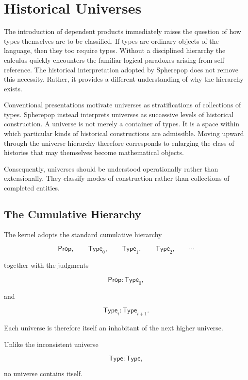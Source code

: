 \documentclass[12pt,oneside]{article}
\theoremstyle{definition}
\theoremstyle{remark}
\newcommand{\Type}{\mathsf{Type}}
\newcommand{\Prop}{\mathsf{Prop}}
\begin{document}
\section{Historical Universes}

The introduction of dependent products immediately raises the question of how
types themselves are to be classified. If types are ordinary objects of the
language, then they too require types. Without a disciplined hierarchy the
calculus quickly encounters the familiar logical paradoxes arising from
self-reference. The historical interpretation adopted by Spherepop does not
remove this necessity. Rather, it provides a different understanding of why the
hierarchy exists.

Conventional presentations motivate universes as stratifications of collections
of types. Spherepop instead interprets universes as successive levels of
historical construction. A universe is not merely a container of types. It is a
space within which particular kinds of historical constructions are admissible.
Moving upward through the universe hierarchy therefore corresponds to enlarging
the class of histories that may themselves become mathematical objects.

Consequently, universes should be understood operationally rather than
extensionally. They classify modes of construction rather than collections of
completed entities.

\subsection{The Cumulative Hierarchy}

The kernel adopts the standard cumulative hierarchy

\[
\Prop,
\qquad
\Type_0,
\qquad
\Type_1,
\qquad
\Type_2,
\qquad
\cdots
\]

together with the judgments

\[
\Prop
:
\Type_0,
\]

and

\[
\Type_i
:
\Type_{i+1}.
\]

Each universe is therefore itself an inhabitant of the next higher universe.

Unlike the inconsistent universe

\[
\Type:\Type,
\]

no universe contains itself.
\end{document}
